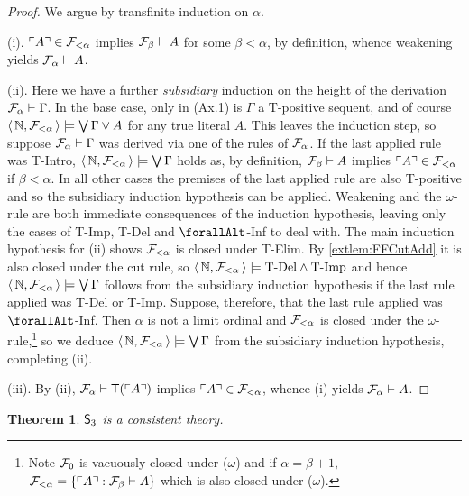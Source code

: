 \documentclass[UKenglish,cleveref,DIV=12]{scrartcl}
\let\forall\forallAlt
\newtheorem{theorem}{Theorem}
\theoremstyle{definition}
\theoremstyle{definition}
\begin{document}
\begin{proof}
We argue by transfinite induction on $\alpha$.

(i). $\ulcorner{A}\urcorner\in\mathcal{F}_{<\alpha}$ implies $\mathcal{F}_\beta\vdash A$ for some $\beta<\alpha$, by definition, whence weakening yields $\mathcal{F}_\alpha\vdash A$.

(ii). Here we have a further {\em subsidiary} induction on the height of the
derivation $\mathcal{F}_\alpha\vdash\Gamma$. In the base case, only in (Ax.1) is $\Gamma$ a T-positive sequent, and of course
$\langle\,\mathbb N,\mathcal{F}_{<\alpha}\,\rangle\models\bigvee\Gamma\lor A$ for any true literal $A$.
This leaves the induction step, so suppose $\mathcal{F}_\alpha\vdash \Gamma$ was
derived via one of the rules of $\mathcal{F}_\alpha$. If the last applied rule was T-Intro,
$\langle\,\mathbb N,\mathcal{F}_{<\alpha}\,\rangle\models\bigvee\Gamma$ holds as, by definition,
$\mathcal{F}_\beta\vdash A$ implies $\ulcorner{A}\urcorner\in\mathcal{F}_{<\alpha}$ if $\beta<\alpha$. In all
other cases the premises of the last applied rule are also T-positive and so
the subsidiary induction hypothesis can be applied. Weakening and the
$\omega$-rule are both immediate consequences of the induction hypothesis, leaving only the cases of T-Imp, T-Del and $\forall$-Inf to deal with. The main induction hypothesis for (ii) shows $\mathcal{F}_{<\alpha}$ is closed under T-Elim. By \cref{extlem:FFCutAdd} it is also closed under the cut rule, so $\langle\,\mathbb N,\mathcal{F}_{<\alpha}\,\rangle\models \text{T-Del}\land\text{T-Imp}$ and hence $\langle\,\mathbb N,\mathcal{F}_{<\alpha}\,\rangle\models\bigvee\Gamma$ follows from the subsidiary induction hypothesis if the last rule applied was T-Del or T-Imp. Suppose, therefore, that the last rule applied was $\forall$-Inf. Then $\alpha$ is not a limit ordinal and $\mathcal{F}_{<\alpha}$ is closed under the $\omega$-rule,\footnote{Note $\mathcal{F}_{\mathord0}$ is vacuously closed under ($\omega$) and if $\alpha=\beta+1$, $\mathcal{F}_{<\alpha}=\{\ulcorner{A}\urcorner:\mathcal{F}_\beta\vdash A\}$ which is also closed under ($\omega$).} so we deduce $\langle\,\mathbb N,\mathcal{F}_{<\alpha}\,\rangle\models\bigvee\Gamma$ from the subsidiary induction hypothesis, completing (ii).

(iii). By (ii), $\mathcal{F}_\alpha\vdash \mathsf{T}(\ulcorner{A}\urcorner)$ implies $\ulcorner{A}\urcorner\in\mathcal{F}_{<\alpha}$,
whence (i) yields $\mathcal{F}_\alpha\vdash A$.
\end{proof}
\begin{theorem}\label{extthm:S3consistent}
 $\mathsf{S}_3$ is a consistent theory.
\end{theorem}
\end{document}
